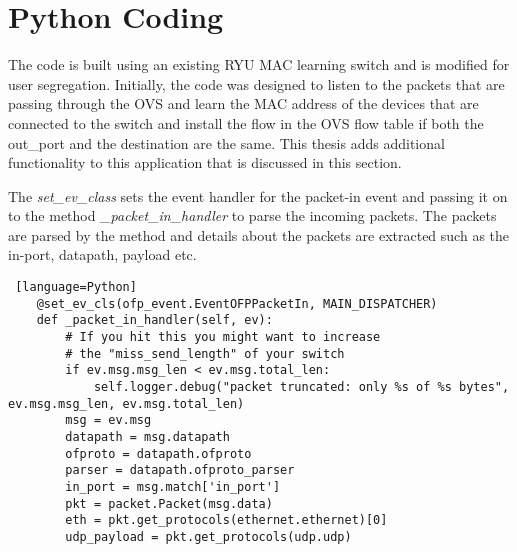 %	

\section{Python Coding}\label{Python_code}
The code is built using an existing RYU MAC learning switch and is modified for user segregation. Initially, the code was designed to listen to the packets that are passing through the OVS and learn the MAC address of the devices that are connected to the switch and install the flow in the OVS flow table if both the out\_port and the destination are the same. This thesis adds additional functionality to this application that is discussed in this section. 

The \textit{set\_ev\_class} sets the event handler for the packet-in event and passing it on to the method \textit{ \_packet\_in\_handler} to parse the incoming packets. The packets are parsed by the method and details about the packets are extracted such as the in-port, datapath, payload etc.

\begin{lstlisting} [language=Python]
	@set_ev_cls(ofp_event.EventOFPPacketIn, MAIN_DISPATCHER)
	def _packet_in_handler(self, ev):
		# If you hit this you might want to increase
		# the "miss_send_length" of your switch
		if ev.msg.msg_len < ev.msg.total_len:
			self.logger.debug("packet truncated: only %s of %s bytes", ev.msg.msg_len, ev.msg.total_len)
		msg = ev.msg
		datapath = msg.datapath
		ofproto = datapath.ofproto
		parser = datapath.ofproto_parser
		in_port = msg.match['in_port']
		pkt = packet.Packet(msg.data)
		eth = pkt.get_protocols(ethernet.ethernet)[0]
		udp_payload = pkt.get_protocols(udp.udp)
\end{lstlisting}

